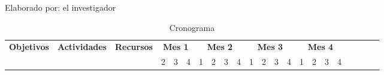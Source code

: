 
\begin{landscape}
  \begin{ThreePartTable}
    \begin{TableNotes}[flushleft]
      \centering
      \item Elaborado por: el investigador
    \end{TableNotes}
    \begin{longtable}{|p{}|p{5.5cm}|p{5.5cm}|l|l|l|l|l|l|l|l|l|l|l|l|l|l|l|l|l|l|l|}
      \caption{Cronograma}
      \label{table:cronograma}                                                                                                                                                                                                                                                                                                                                                                                                                                                                                                                                                                                                                                                                                                                                                                                                                                     \\
      \hline
      \multirow{2}{*}{\bfseries Objetivos}                                                                                                                                                     & \multirow{2}{*}{\bfseries Actividades}                                                     & \multirow{2}{*}{\bfseries Recursos}                                                                               & \multicolumn{3}{|c|}{\bfseries Mes 1} & \multicolumn{4}{|c|}{\bfseries Mes 2} & \multicolumn{4}{|c|}{\bfseries Mes 3} & \multicolumn{4}{|c|}{\bfseries Mes 4}                                                                                                                                                                                                                                                                                    \\
      \cline{4-21}
                                                                                                                                                                                               &                                                                                            &                                                                                                                   & 2                                     & 3                                     & 4                                     & 1                                     & 2                      & 3                      & 4                      & 1                      & 2                      & 3                      & 4                      & 1                      & 2                      & 3                      & 4                      \\

\end{longtable}
\end{ThreePartTable}
\end{landscape}
